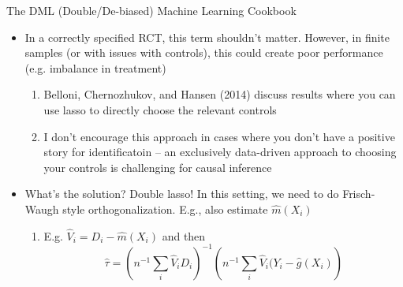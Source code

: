   \begin{frame}{The DML (Double/De-biased) Machine Learning Cookbook}
    \begin{itemize}
    \item In a correctly specified RCT, this term shouldn't
      matter. However, in finite samples (or with issues with controls),
      this could create poor performance (e.g. imbalance in treatment)
      \begin{enumerate}[-]
      \item Belloni, Chernozhukov, and Hansen (2014) discuss results
        where you can use lasso to directly choose the relevant controls
      \item I don't encourage this approach in cases where you don't
        have a positive story for identificatoin -- an exclusively
        data-driven approach to choosing your controls is challenging
        for causal inference
      \end{enumerate}
    \item What's the solution? Double lasso! In this setting, we need to
      do Frisch-Waugh style orthogonalization. E.g., also estimate
      $\hat{m}(X_{i})$
      \begin{enumerate}[-]
      \item E.g. $\hat{V}_{i} = D_{i} - \hat{m}(X_{i})$  and then
    $$\hat{\tau} = \left(n^{-1}\sum_{i}\hat{V}_{i}D_{i}\right)^{-1}\left(n^{-1}\sum_{i}\hat{V}_{i}(Y_{i} - \hat{g}(X_{i})\right)$$      
      \end{enumerate}
    \end{itemize}
  \end{frame}
  
